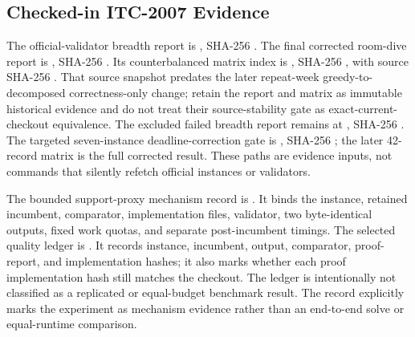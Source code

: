 \subsection*{Checked-in ITC-2007 Evidence}
The official-validator breadth report is , SHA-256 .
The final corrected room-dive report is , SHA-256 .
Its counterbalanced matrix index is , SHA-256 , with source SHA-256 .
That source snapshot predates the later repeat-week greedy-to-decomposed correctness-only change; retain the report and matrix as immutable historical evidence and do not treat their source-stability gate as exact-current-checkout equivalence.
The excluded failed breadth report remains at , SHA-256 .
The targeted seven-instance deadline-correction gate is , SHA-256 ; the later 42-record matrix is the full corrected result.
These paths are evidence inputs, not commands that silently refetch official instances or validators.

The bounded support-proxy mechanism record is .
It binds the instance, retained incumbent, comparator, implementation files, validator, two byte-identical outputs, fixed work quotas, and separate post-incumbent timings.
The selected quality ledger is .
It records instance, incumbent, output, comparator, proof-report, and implementation hashes; it also marks whether each proof implementation hash still matches the checkout.
The ledger is intentionally not classified as a replicated or equal-budget benchmark result.
The record explicitly marks the experiment as mechanism evidence rather than an end-to-end solve or equal-runtime comparison.

